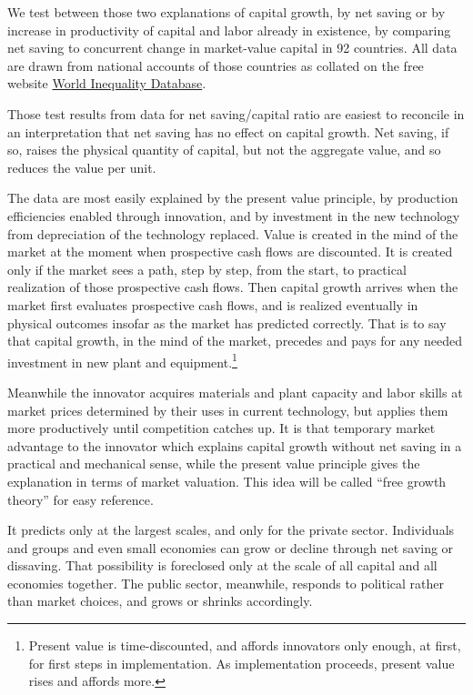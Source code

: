 \documentclass[a4paper,fleqn]{latex_styles/cas-sc}
\begin{document}
We test between those two explanations of capital growth, by net
saving or by increase in productivity of capital and labor already
in existence, by comparing net saving to concurrent change in
market-value capital in 92 countries. All data are drawn from national accounts
of those countries as collated on the free website \href{https://wid.world/}{World Inequality Database}.

Those test results from data for net saving/capital ratio 
are easiest to reconcile in an interpretation that net saving has no effect on capital growth.
Net saving, if so, raises the physical quantity of capital, but not the
aggregate value, and so reduces the value per unit.

The data are most easily explained by the present value principle,
by production efficiencies enabled through innovation, and by investment in the new technology from depreciation of the technology replaced. Value is
created in the mind of the market at the moment when prospective cash
flows are discounted. It is created only if the market sees a path, step
by step, from the start, to practical realization of those prospective
cash flows. Then capital growth arrives when the market first evaluates
prospective cash flows, and is realized eventually in physical outcomes
insofar as the market has predicted correctly. That is to say that capital
growth, in the mind of the market, precedes and pays for any needed investment
in new plant and equipment.\footnote{Present value is time-discounted, and affords innovators only enough, at first, for first steps in implementation. As implementation proceeds, present value rises and affords more.}

Meanwhile the innovator
acquires materials and plant capacity and labor skills at market prices
determined by their uses in current technology, but applies them more
productively until competition catches up. It is that temporary market
advantage to the innovator which explains capital growth without net
saving in a practical and mechanical sense, while the present value
principle gives the explanation in terms of market valuation. This idea
will be called ``free growth theory'' for easy reference.

It predicts only at the largest scales, and only for the private sector.
Individuals and groups and even small economies can grow
or decline through net saving or dissaving. That possibility is foreclosed only at the
scale of all capital and all economies together. The public sector,
meanwhile, responds to political rather than market choices, and grows
or shrinks accordingly.
\end{document}
